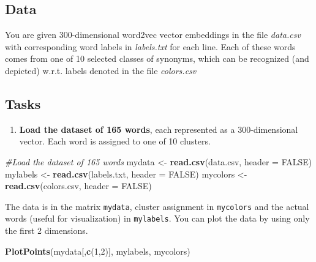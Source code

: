 \documentclass[]{article}
\newenvironment{Shaded}{\begin{snugshade}}{\end{snugshade}}
\newcommand{\CommentTok}[1]{\textcolor[rgb]{0.56,0.35,0.01}{\textit{#1}}}
\newcommand{\DataTypeTok}[1]{\textcolor[rgb]{0.13,0.29,0.53}{#1}}
\newcommand{\DecValTok}[1]{\textcolor[rgb]{0.00,0.00,0.81}{#1}}
\newcommand{\KeywordTok}[1]{\textcolor[rgb]{0.13,0.29,0.53}{\textbf{#1}}}
\newcommand{\NormalTok}[1]{#1}
\newcommand{\OtherTok}[1]{\textcolor[rgb]{0.56,0.35,0.01}{#1}}
\newcommand{\StringTok}[1]{\textcolor[rgb]{0.31,0.60,0.02}{#1}}
\providecommand{\tightlist}{%
  \setlength{\itemsep}{0pt}\setlength{\parskip}{0pt}}
\begin{document}
\hypertarget{data}{%
\subsection{Data}\label{data}}

You are given 300-dimensional word2vec vector embeddings in the file
\emph{data.csv} with corresponding word labels in \emph{labels.txt} for
each line. Each of these words comes from one of 10 selected classes of
synonyms, which can be recognized (and depicted) w.r.t. labels denoted
in the file \emph{colors.csv}

\hypertarget{tasks}{%
\subsection{Tasks}\label{tasks}}

\begin{enumerate}
\def\labelenumi{\arabic{enumi}.}
\tightlist
\item
  \textbf{Load the dataset of 165 words}, each represented as a
  300-dimensional vector. Each word is assigned to one of 10 clusters.
\end{enumerate}

\begin{Shaded}
\begin{Highlighting}[]
\CommentTok{\#Load the dataset of 165 words}
\NormalTok{mydata <{-}}\StringTok{ }\KeywordTok{read.csv}\NormalTok{(}\StringTok{\textquotesingle{}data.csv\textquotesingle{}}\NormalTok{, }\DataTypeTok{header =} \OtherTok{FALSE}\NormalTok{)}
\NormalTok{mylabels <{-}}\StringTok{ }\KeywordTok{read.csv}\NormalTok{(}\StringTok{\textquotesingle{}labels.txt\textquotesingle{}}\NormalTok{, }\DataTypeTok{header =} \OtherTok{FALSE}\NormalTok{)}
\NormalTok{mycolors <{-}}\StringTok{ }\KeywordTok{read.csv}\NormalTok{(}\StringTok{\textquotesingle{}colors.csv\textquotesingle{}}\NormalTok{, }\DataTypeTok{header =} \OtherTok{FALSE}\NormalTok{)}
\end{Highlighting}
\end{Shaded}

The data is in the matrix \texttt{mydata}, cluster assignment in
\texttt{mycolors} and the actual words (useful for visualization) in
\texttt{mylabels}. You can plot the data by using only the first 2
dimensions.

\begin{Shaded}
\begin{Highlighting}[]
\KeywordTok{PlotPoints}\NormalTok{(mydata[,}\KeywordTok{c}\NormalTok{(}\DecValTok{1}\NormalTok{,}\DecValTok{2}\NormalTok{)], mylabels, mycolors)}
\end{Highlighting}
\end{Shaded}
\end{document}
